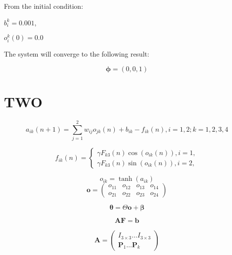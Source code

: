\documentclass{article}
\renewcommand{\vec}[1]{\mathbf{#1}}
\begin{document}
From the initial condition:

$b_{i}^{k}=0.001$,

$o_{i}^{k}(0)=0.0$

The system will converge to the following result:

\begin{equation}
    \vec{\phi}=(0,0,1)
    \label{<+label+>}
\end{equation}




\section{TWO}


\begin{equation}
    a_{ik}(n+1)=\sum_{j=1}^{2} w_{ij}o_{jk}(n)+b_{ik}-f_{ik}(n), i=1,2; k=1,2,3,4 
    \label{<+label+>}
\end{equation}

\begin{equation}
    f_{ik}(n)=\left\{
        \begin{array}{rcl}
            \gamma F_{k3}(n) \cos(o_{ik}(n)), i=1,\\
            \gamma F_{k3}(n) \sin(o_{ik}(n)), i=2,
        \end{array}
    \right.
    \label{equ:2}
\end{equation}


\begin{equation}
    o_{ik}=\tanh(a_{ik})
    \label{<+label+>}
\end{equation}
\begin{equation}
\vec{o} = 
    \begin{pmatrix}
        o_{11} & o_{12} & o_{13} & o_{14} \\
        o_{21} & o_{22} & o_{23} & o_{24}
    \end{pmatrix}
    \label{<+label+>}
\end{equation}

\begin{equation}
    \mathbf{\vec{\theta}}=\Theta \vec{o} + \mathbf{\beta}
\end{equation}

\begin{equation}
    \vec{A}\vec{F}=\vec{b}
    \label{<+label+>}
\end{equation}

\begin{equation}
        \vec{A}=
        \begin{pmatrix}
            I_{3 \times 3} \dots I_{3 \times 3} \\
            \vec{P}_{1} \dots \vec{P}_{k}
        \end{pmatrix}
    \label{<+label+>}
\end{equation}
\end{document}
